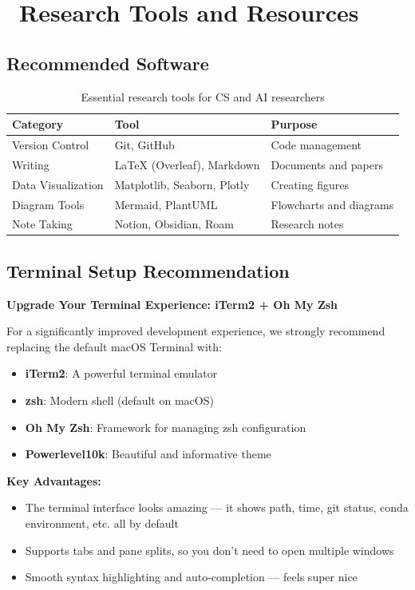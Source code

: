 \documentclass[11pt,a4paper]{article}
\begin{document}
\section{\faToolbox~Research Tools and Resources}

\subsection{Recommended Software}
\begin{table}[H]
\centering
\begin{tabular}{@{}lll@{}}
\toprule
\textbf{Category} & \textbf{Tool} & \textbf{Purpose} \\
\midrule
Version Control & Git, GitHub & Code management \\
Writing & LaTeX (Overleaf), Markdown & Documents and papers \\
Data Visualization & Matplotlib, Seaborn, Plotly & Creating figures \\
Diagram Tools & Mermaid, PlantUML & Flowcharts and diagrams \\
Note Taking & Notion, Obsidian, Roam & Research notes \\
\bottomrule
\end{tabular}
\caption{Essential research tools for CS and AI researchers}
\end{table}

\subsection{Terminal Setup Recommendation}

\textbf{Upgrade Your Terminal Experience: iTerm2 + Oh My Zsh}

For a significantly improved development experience, we strongly recommend replacing the default macOS Terminal with:
\begin{itemize}
    \item \textbf{iTerm2}: A powerful terminal emulator
    \item \textbf{zsh}: Modern shell (default on macOS)
    \item \textbf{Oh My Zsh}: Framework for managing zsh configuration
    \item \textbf{Powerlevel10k}: Beautiful and informative theme
\end{itemize}

\textbf{Key Advantages:}
\begin{itemize}
    \item The terminal interface looks amazing — it shows path, time, git status, conda environment, etc. all by default
    \item Supports tabs and pane splits, so you don't need to open multiple windows
    \item Smooth syntax highlighting and auto-completion — feels super nice
\end{itemize}
\end{document}
